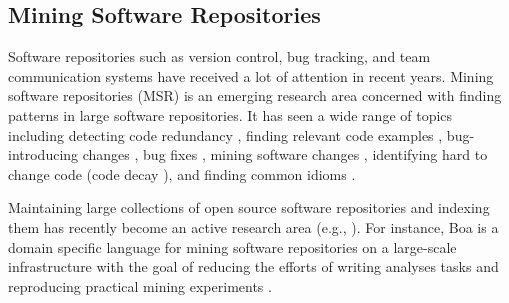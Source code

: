 \subsection{Mining Software Repositories}
Software repositories such as version control, bug tracking, and team communication systems have received a lot of attention in recent years.
Mining software repositories (MSR) is an emerging research area concerned with finding patterns in large software repositories.
It has seen a wide range of topics including detecting code redundancy \cite{Kawrykow_2009_ASE,Carzaniga_2015_ICSE}, finding relevant code examples \cite{Holmes_2005_ICSE,Sahavechaphan_2006_OOPSLA,Mandelin_2005_PLDI,Stylos_2006_VLHCC}, bug-introducing changes \cite{Sunghun_ASE_2006}, bug fixes \cite{Kim_2006_FSE,Osman_CSMR-WCRE_2014}, mining software changes \cite{Zimmermann_2005_SE,Ray_2015_MSR}, identifying hard to change code (code decay \cite{Eick_2001_SETransaction}), and finding common idioms \cite{fast_2014_CHI}.

Maintaining large collections of open source software repositories and indexing them has recently become an active research area (e.g., \cite{bajracharya_2006_OOPSLA,Caneill_2014_ESEM,Lee_2010_FSE,Stolee_2014_TOSEM}).
For instance, Boa is a domain specific language for mining software repositories on a large-scale infrastructure with the goal of reducing the efforts of writing analyses tasks and reproducing practical mining experiments \cite{Dyer_2013_ICSE}.
